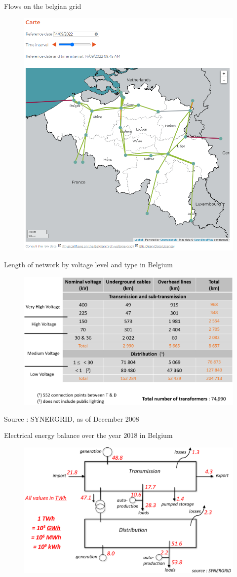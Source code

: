 \begin{frame}{Flows on the belgian grid}
\begin{figure}
\centering
\includegraphics[width=0.4\linewidth]{images/20220914_ELIA_flows.png}
\end{figure}
\end{frame}

\begin{frame}{Length of network by voltage level and type in Belgium}
\begin{figure}
\centering
\includegraphics[width=0.6\linewidth]{images/stats_cables_and_lines_be.png}
\end{figure}
\vfill
\footnotesize{Source : SYNERGRID, as of December 2008}
\end{frame}


\begin{frame}
{Electrical energy balance over the year 2018 in Belgium}
\begin{figure}
\centering
\includegraphics[width=0.6\linewidth]{images/energy_balance_BE_2018.png}
\end{figure}
\end{frame}

